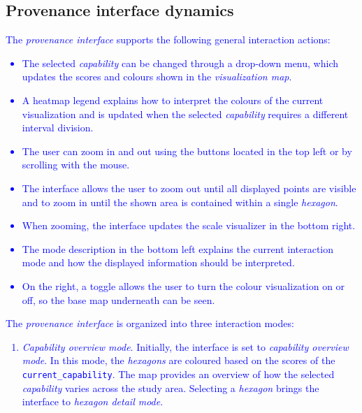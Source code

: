 \documentclass{article}
\newcommand{\mm}[1]{\textcolor{blue}{#1}}
\begin{document}
\subsection{Provenance interface dynamics}
\mm{The \emph{provenance interface} supports the following general interaction actions:
\begin{itemize}
    \item The selected \emph{capability} can be changed through a drop-down menu, which updates the scores and colours shown in the \emph{visualization map}.
    \item A heatmap legend explains how to interpret the colours of the current visualization and is updated when the selected \emph{capability} requires a different interval division.
    \item The user can zoom in and out using the buttons located in the top left or by scrolling with the mouse.
    \item The interface allows the user to zoom out until all displayed points are visible and to zoom in until the shown area is contained within a single \emph{hexagon}.
    \item When zooming, the interface updates the scale visualizer in the bottom right.
    \item The mode description in the bottom left explains the current interaction mode and how the displayed information should be interpreted.
    \item On the right, a toggle allows the user to turn the colour visualization on or off, so the base map underneath can be seen.
\end{itemize}
The \emph{provenance interface} is organized into three interaction modes:
\begin{enumerate}
    \item \emph{Capability overview mode}. Initially, the interface is set to \emph{capability overview mode}. In this mode, the \emph{hexagons} are coloured based on the scores of the \texttt{current\_capability}. The map provides an overview of how the selected \emph{capability} varies across the study area. Selecting a \emph{hexagon} brings the interface to \emph{hexagon detail mode}.

\end{enumerate}}
\end{document}
